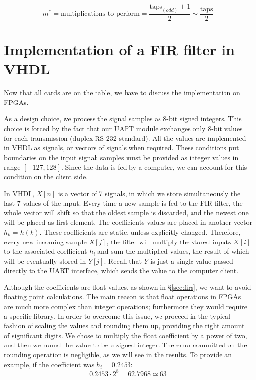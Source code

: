 \[ m^* = \textrm{multiplications to perform} = \frac{\textrm{taps}_{(odd)} + 1}{2} \sim \frac{\textrm{taps}}{2}\]





\section{Implementation of a FIR filter in VHDL}
\label{sec:implementation}

Now that all cards are on the table, we have to discuss the implementation on FPGAs.

As a design choice, we process the signal samples as 8-bit signed integers. This choice is forced by the fact that our UART module exchanges only 8-bit values for each transmission (duplex RS-232 standard). All the values are implemented in VHDL as signals, or vectors of signals when required. These conditions put boundaries on the input signal: samples must be provided as integer values in range $[-127, 128]$. Since the data is fed by a computer, we can account for this condition on the client side.

In VHDL, $X[n]$ is a vector of 7 signals, in which we store simultaneously the last 7 values of the input. Every time a new sample is fed to the FIR filter, the whole vector will shift so that the oldest sample is discarded, and the newest one will be placed as first element. The coefficients values are placed in another vector $h_k = h(k)$. These coefficients are static, unless explicitly changed. Therefore, every new incoming sample $X[j]$, the filter will multiply the stored inputs $X[i]$ to the associated coefficient $h_i$ and sum the multiplied values, the result of which will be eventually stored in $Y[j]$. Recall that $Y$ is just a single value passed directly to the UART interface, which sends the value to the computer client.

Although the coefficients are float values, as shown in §\ref{sec:firs}, we want to avoid floating point calculations. The main reason is that float operations in FPGAs are much more complex than integer operations; furthermore they would require a specific library. In order to overcome this issue, we proceed in the typical fashion of scaling the values and rounding them up, providing the right amount of significant digits. We chose to multiply the float coefficient by a power of two, and then we round the value to be a signed integer. The error committed on the rounding operation is negligible, as we will see in the results. To provide an example, if the coefficient was $h_i = 0.2453$:
\[0.2453 \cdot 2^8 = 62.7968 \simeq 63\]

